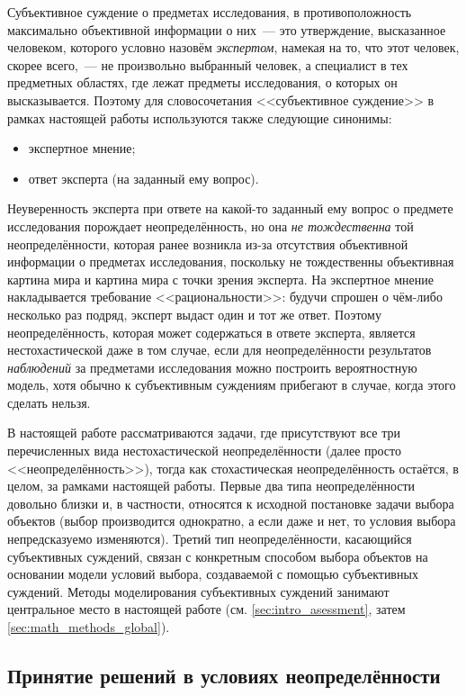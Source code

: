 Субъективное суждение о предметах исследования, в противоположность максимально объективной информации о них~--- это утверждение, высказанное человеком, которого  условно назовём {\sl экспертом}, намекая на то, что этот человек, скорее всего,~--- не произвольно выбранный человек, а специалист в тех предметных областях, где лежат предметы исследования, о которых он высказывается. Поэтому для словосочетания <<субъективное суждение>> в рамках настоящей работы используются также следующие синонимы: 
\begin{itemize}
	\item экспертное мнение;
	\item ответ эксперта (на заданный ему вопрос). 
 \end{itemize}
 
Неуверенность эксперта при ответе на какой-то заданный ему вопрос о предмете исследования порождает неопределённость, но она {\sl не тождественна} той неопределённости, которая ранее возникла из-за отсутствия объективной информации о предметах исследования, поскольку не тождественны объективная картина мира и картина мира с точки зрения эксперта. На экспертное мнение накладывается требование <<рациональности>>: будучи спрошен о чём-либо несколько раз подряд, эксперт выдаст один и тот же ответ. Поэтому неопределённость, которая может содержаться в ответе эксперта, является нестохастической даже в том случае, если для неопределённости результатов {\sl наблюдений} за предметами исследования можно построить вероятностную модель, хотя обычно к субъективным суждениям прибегают в случае, когда этого сделать нельзя. 

В настоящей работе рассматриваются задачи, где присутствуют все три перечисленных вида нестохастической неопределённости (далее просто <<неопределённость>>), тогда как стохастическая неопределённость остаётся, в целом, за рамками настоящей работы. Первые два типа неопределённости довольно близки и, в частности, относятся к исходной постановке задачи выбора объектов (выбор производится однократно, а если даже и нет, то условия выбора непредсказуемо изменяются). Третий тип неопределённости, касающийся субъективных суждений, связан с конкретным способом выбора объектов на основании модели условий выбора, создаваемой с помощью субъективных суждений. Методы моделирования субъективных суждений занимают центральное место в настоящей работе (см. \ref{sec:intro_asessment}, затем \ref{sec:math_methods_global}).  

\subsection{Принятие решений в условиях неопределённости}

